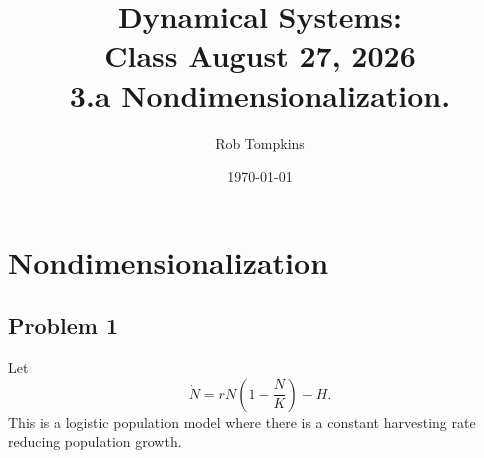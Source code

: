 \documentclass[12pt]{amsart}
\title{Dynamical Systems:\\Class August 27, 2026\\ 3.a Nondimensionalization.}
\author{Rob Tompkins}
\date{\today}
\theoremstyle{conjecture}
\theoremstyle{definition}
\theoremstyle{question}
\theoremstyle{theorem}
\begin{document}
    \maketitle

    \section*{Nondimensionalization}

    \subsection*{Problem 1}

    Let
    \[
        \dot N=rN\left(1-\frac{N}{K}\right)-H.
    \]
    This is a logistic population model where there is a constant
    harvesting rate reducing population growth.
\end{document}
